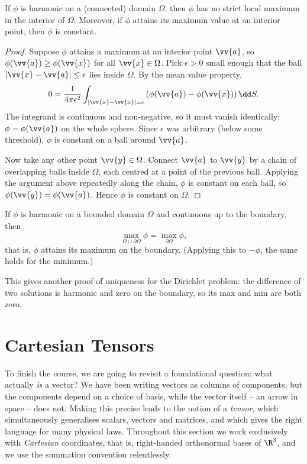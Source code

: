 \begin{theorem}
	If $\phi$ is harmonic on a (connected) domain $\Omega$, then $\phi$ has no strict local maximum in the interior of $\Omega$. Moreover, if $\phi$ attains its maximum value at an interior point, then $\phi$ is constant.
\end{theorem}
\begin{proof}
	Suppose $\phi$ attains a maximum at an interior point $\vv{a}$, so $\phi(\vv{a}) \geq \phi(\vv{x})$ for all $\vv{x} \in \Omega$. Pick $\epsilon > 0$ small enough that the ball $|\vv{x} - \vv{a}| \leq \epsilon$ lies inside $\Omega$. By the mean value property,
	$$
	0 = \frac{1}{4 \pi \epsilon^2}\int_{|\vv{x} - \vv{a}| = \epsilon} \left(\phi(\vv{a}) - \phi(\vv{x})\right) \dd S.
	$$
	The integrand is continuous and non-negative, so it must vanish identically: $\phi = \phi(\vv{a})$ on the whole sphere. Since $\epsilon$ was arbitrary (below some threshold), $\phi$ is constant on a ball around $\vv{a}$.

	Now take any other point $\vv{y} \in \Omega$. Connect $\vv{a}$ to $\vv{y}$ by a chain of overlapping balls inside $\Omega$, each centred at a point of the previous ball. Applying the argument above repeatedly along the chain, $\phi$ is constant on each ball, so $\phi(\vv{y}) = \phi(\vv{a})$. Hence $\phi$ is constant on $\Omega$.
\end{proof}

\begin{corollary}
	If $\phi$ is harmonic on a bounded domain $\Omega$ and continuous up to the boundary, then
	$$
	\max_{\Omega \cup \partial \Omega} \phi = \max_{\partial \Omega} \phi,
	$$
	that is, $\phi$ attains its maximum on the boundary. (Applying this to $-\phi$, the same holds for the minimum.)
\end{corollary}

This gives another proof of uniqueness for the Dirichlet problem: the difference of two solutions is harmonic and zero on the boundary, so its max and min are both zero.
\section{Cartesian Tensors}

To finish the course, we are going to revisit a foundational question: what actually \emph{is} a vector? We have been writing vectors as columns of components, but the components depend on a choice of basis, while the vector itself -- an arrow in space -- does not. Making this precise leads to the notion of a \emph{tensor}, which simultaneously generalises scalars, vectors and matrices, and which gives the right language for many physical laws. Throughout this section we work exclusively with \emph{Cartesian} coordinates, that is, right-handed orthonormal bases of $\R^3$, and we use the summation convention relentlessly.

